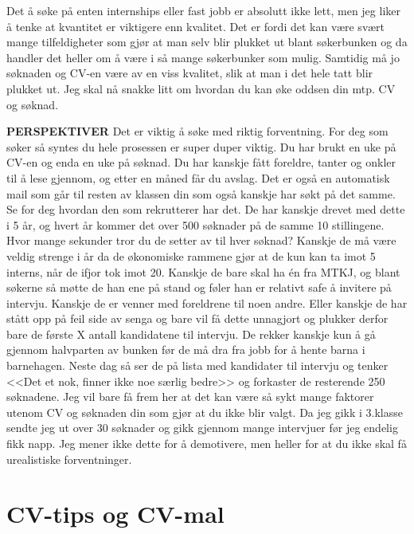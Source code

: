 Det å søke på enten internships eller fast jobb er absolutt ikke lett, men jeg liker å tenke at kvantitet er viktigere enn kvalitet. Det er fordi det kan være svært mange tilfeldigheter som gjør at man selv blir plukket ut blant søkerbunken og da handler det heller om å være i så mange søkerbunker som mulig. Samtidig må jo søknaden og CV-en være av en viss kvalitet, slik at man i det hele tatt blir plukket ut. Jeg skal nå snakke litt om hvordan du kan øke oddsen din mtp. CV og søknad. 

\begin{remark}
    \textbf{PERSPEKTIVER} Det er viktig å søke med riktig forventning. For deg som søker så syntes du hele prosessen er super duper viktig. Du har brukt en uke på CV-en og enda en uke på søknad. Du har kanskje fått foreldre, tanter og onkler til å lese gjennom, og etter en måned får du avslag. Det er også en automatisk mail som går til resten av klassen din som også kanskje har søkt på det samme. Se for deg hvordan den som rekrutterer har det. De har kanskje drevet med dette i 5 år, og hvert år kommer det over 500 søknader på de samme 10 stillingene. Hvor mange sekunder tror du de setter av til hver søknad? Kanskje de må være veldig strenge i år da de økonomiske rammene gjør at de kun kan ta imot 5 interns, når de ifjor tok imot 20. Kanskje de bare skal ha én fra MTKJ, og blant søkerne så møtte de han ene på stand og føler han er relativt safe å invitere på intervju. Kanskje de er venner med foreldrene til noen andre. Eller kanskje de har stått opp på feil side av senga og bare vil få dette unnagjort og plukker derfor bare de første X antall kandidatene til intervju. De rekker kanskje kun å gå gjennom halvparten av bunken før de må dra fra jobb for å hente barna i barnehagen. Neste dag så ser de på lista med kandidater til intervju og tenker <<Det et nok, finner ikke noe særlig bedre>> og forkaster de resterende 250 søknadene. Jeg vil bare få frem her at det kan være så sykt mange faktorer utenom CV og søknaden din som gjør at du ikke blir valgt. Da jeg gikk i 3.klasse sendte jeg ut over 30 søknader og gikk gjennom mange intervjuer før jeg endelig fikk napp. Jeg mener ikke dette for å demotivere, men heller for at du ikke skal få urealistiske forventninger. 
\end{remark}




\section{CV-tips og CV-mal}

